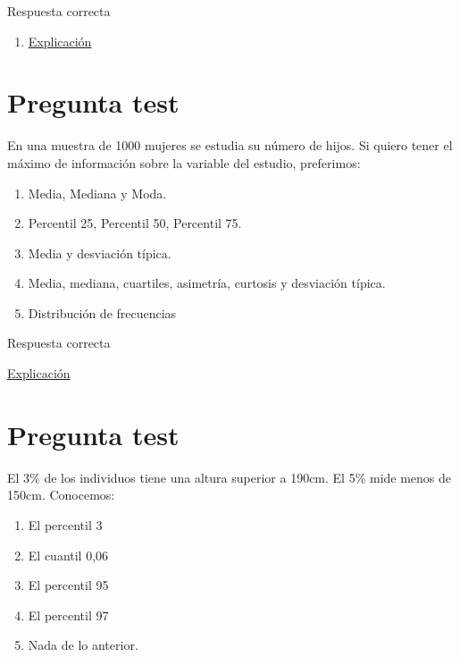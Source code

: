 \documentclass[
]{book}
\providecommand{\tightlist}{%
  \setlength{\itemsep}{0pt}\setlength{\parskip}{0pt}}
\begin{document}
Respuesta correcta

\begin{enumerate}
\def\labelenumi{\alph{enumi})}
\setcounter{enumi}{4}
\tightlist
\item
  \href{https://en.wikipedia.org/wiki/Coefficient_of_variation}{Explicación}
\end{enumerate}

\hypertarget{pregunta-test-83}{%
\section{Pregunta test}\label{pregunta-test-83}}

En una muestra de 1000 mujeres se estudia su número de hijos. Si quiero tener el máximo de información sobre la variable del estudio, preferimos:

\begin{enumerate}
\def\labelenumi{\alph{enumi})}
\tightlist
\item
  Media, Mediana y Moda.
\item
  Percentil 25, Percentil 50, Percentil 75.
\item
  Media y desviación típica.
\item
  Media, mediana, cuartiles, asimetría, curtosis y desviación típica.
\item
  Distribución de frecuencias
\end{enumerate}

Respuesta correcta

\href{https://1fjmanzano.github.io/bioestadistica/tablas-de-frecuencias.html}{Explicación}

\hypertarget{pregunta-test-84}{%
\section{Pregunta test}\label{pregunta-test-84}}

El 3\% de los individuos tiene una altura superior a 190cm. El 5\% mide menos de 150cm. Conocemos:

\begin{enumerate}
\def\labelenumi{\alph{enumi})}
\tightlist
\item
  El percentil 3
\item
  El cuantil 0,06
\item
  El percentil 95
\item
  El percentil 97
\item
  Nada de lo anterior.
\end{enumerate}
\end{document}
